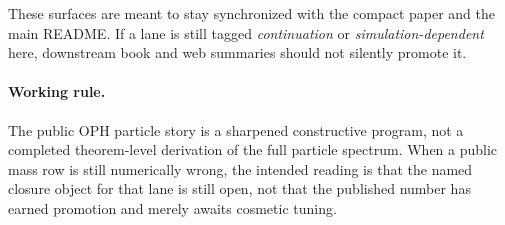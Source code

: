 \documentclass[11pt]{article}
\begin{document}
These surfaces are meant to stay synchronized with the compact paper and the
main README. If a lane is still tagged \emph{continuation} or
\emph{simulation-dependent} here, downstream book and web summaries should not
silently promote it.

\paragraph{Working rule.}
The public OPH particle story is a sharpened constructive program, not
a completed theorem-level derivation of the full particle spectrum. When a
public mass row is still numerically wrong, the intended reading is that the
named closure object for that lane is still open, not that the published number
has earned promotion and merely awaits cosmetic tuning.
\end{document}
